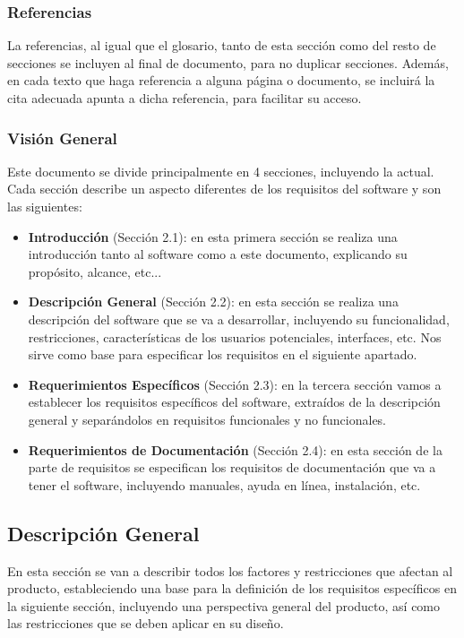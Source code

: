 \subsubsection{Referencias}
La referencias, al igual que el glosario, tanto de esta sección como del resto de secciones se incluyen al final de documento, para no duplicar secciones. Además, en cada texto que haga referencia a alguna página o documento, se incluirá la cita adecuada apunta a dicha referencia, para facilitar su acceso.


\subsubsection{Visión General}
Este documento se divide principalmente en 4 secciones, incluyendo la actual. Cada sección describe un aspecto diferentes de los requisitos del software y son las siguientes:

\begin{itemize}
	\item \textbf{Introducción} (Sección 2.1): en esta primera sección se realiza una introducción tanto al software como a este documento, explicando su propósito, alcance, etc...
	
	\item \textbf{Descripción General} (Sección 2.2): en esta sección se realiza una descripción del software que se va a desarrollar, incluyendo su funcionalidad, restricciones, características de los usuarios potenciales, interfaces, etc. Nos sirve como base para especificar los requisitos en el siguiente apartado.
	
	\item \textbf{Requerimientos Específicos} (Sección 2.3): en la tercera sección vamos a establecer los requisitos específicos del software, extraídos de la descripción general y separándolos en requisitos funcionales y no funcionales.
	
	\item \textbf{Requerimientos de Documentación} (Sección 2.4): en esta sección de la parte de requisitos se especifican los requisitos de documentación que va a tener el software, incluyendo manuales, ayuda en línea, instalación, etc.
\end{itemize}

\subsection{Descripción General}
En esta sección se van a describir todos los factores y restricciones que afectan al producto, estableciendo una base para la definición de los requisitos específicos en la siguiente sección, incluyendo una perspectiva general del producto, así como las restricciones que se deben aplicar en su diseño.

